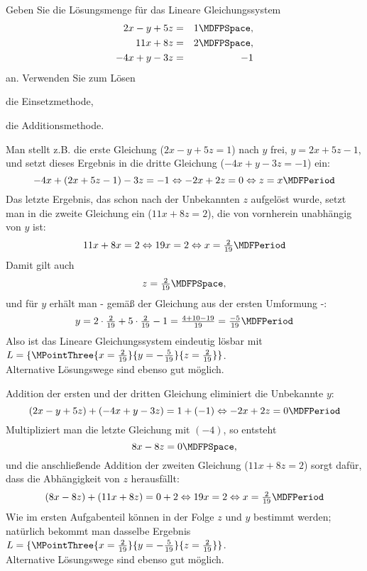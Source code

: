 \begin{MExercises}
\begin{MExercise}
Geben Sie die Lösungsmenge für das Lineare Gleichungssystem
\begin{eqnarray*}
2 x - y + 5 z & = & 1 \MDFPSpace, \\ 11 x + 8 z & = & 2 \MDFPSpace, \\ - 4 x + y - 3 z & = & - 1
\end{eqnarray*}
an. Verwenden Sie zum Lösen
\begin{MExerciseItems}
\item{die Einsetzmethode,}
\item{die Additionsmethode.}
\end{MExerciseItems}

\begin{MHint}{\iSolution}
\begin{MExerciseItems}
\item{Man stellt z.B. die erste Gleichung ($2 x - y + 5 z = 1$) nach $y$ frei, $y = 2 x + 5 z - 1$,
und setzt dieses Ergebnis in die dritte Gleichung ($- 4 x + y - 3 z = - 1$) ein:
$$- 4 x + (2 x + 5 z - 1) - 3 z = - 1 \Leftrightarrow - 2 x + 2 z = 0 \Leftrightarrow z = x \MDFPeriod$$
Das letzte Ergebnis, das schon nach der Unbekannten $z$ aufgelöst wurde, setzt man in die zweite
Gleichung ein ($11 x + 8 z = 2$), die von vornherein unabhängig von $y$ ist:
$$11 x + 8 x = 2 \Leftrightarrow 19 x = 2 \Leftrightarrow x = \Mtfrac{2}{19} \MDFPeriod$$
Damit gilt auch
$$z = \Mtfrac{2}{19} \MDFPSpace ,$$
und für $y$ erhält man - gemäß der Gleichung aus der ersten Umformung -:
$$y = 2 \cdot \Mtfrac{2}{19} + 5 \cdot \Mtfrac{2}{19} - 1 = \Mtfrac{4 + 10 - 19}{19} = \Mtfrac{-5}{19} \MDFPeriod$$
Also ist das Lineare Gleichungssystem eindeutig lösbar mit ${\ML} = \{ \MPointThree{x = \Mtfrac{2}{19}}{
y = - \Mtfrac{5}{19}}{ z = \Mtfrac{2}{19}} \}$.\\
Alternative Lösungswege sind ebenso gut möglich.}
\item{Addition der ersten und der dritten Gleichung eliminiert die Unbekannte $y$:
$$(2 x - y + 5 z) + (- 4 x + y - 3 z) = 1 + (- 1) \Leftrightarrow - 2 x + 2 z = 0 \MDFPeriod$$
Multipliziert man die letzte Gleichung mit $(- 4)$, so entsteht
$$8 x - 8 z = 0 \MDFPSpace ,$$
und die anschließende Addition der zweiten Gleichung ($11 x  + 8 z = 2$) sorgt dafür, dass die Abhängigkeit
von $z$ herausfällt:
$$(8 x - 8 z) + (11 x + 8 z) = 0 + 2 \Leftrightarrow 19 x = 2 \Leftrightarrow x = \Mtfrac{2}{19} \MDFPeriod$$
Wie im ersten Aufgabenteil können in der Folge $z$ und $y$ bestimmt werden; natürlich bekommt man
dasselbe Ergebnis ${\ML} = \{ \MPointThree{x = \Mtfrac{2}{19}}{y = - \Mtfrac{5}{19}}{z = \Mtfrac{2}{19}} \}$.\\
Alternative Lösungswege sind ebenso gut möglich.}
\end{MExerciseItems}
\end{MHint}
\end{MExercise}


\end{MExercises}
